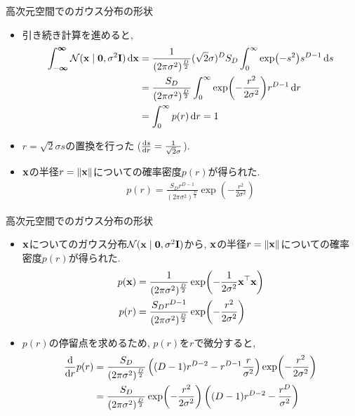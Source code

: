 \documentclass[dvipdfmx,notheorems,t]{beamer}
\begin{document}
\begin{frame}{高次元空間でのガウス分布の形状}
\begin{itemize}
  \item 引き続き計算を進めると,
  \begin{align*}
    \int_{-\boldsymbol{\infty}}^{\boldsymbol{\infty}}
      \mathcal{N}(\vb{x} \mid \vb{0}, \sigma^2 \vb{I}) \dd{\vb{x}}
      &= \frac{1}{(2\pi \sigma^2)^\frac{D}{2}} (\sqrt{2} \sigma)^D
        S_D \int_0^\infty \exp(-s^2) s^{D - 1} \dd{s} \\
      &= \frac{S_D}{(2\pi \sigma^2)^\frac{D}{2}}
        \int_0^\infty \exp(-\frac{r^2}{2 \sigma^2}) r^{D - 1} \dd{r} \\
      &= \int_0^\infty p(r) \dd{r} = 1
  \end{align*}

  \item $r = \sqrt{2} \sigma s$の置換を行った ($\dv{s}{r} = \frac{1}{\sqrt{2} \sigma}$).
  \item $\vb{x}$の半径$r = \left\| \vb{x} \right\|$についての確率密度$p(r)$が得られた.
  \begin{align*}
    p(r) = \frac{S_D r^{D - 1}}{(2\pi \sigma^2)^\frac{D}{2}} \exp(-\frac{r^2}{2 \sigma^2})
  \end{align*}
\end{itemize}
\end{frame}

\begin{frame}{高次元空間でのガウス分布の形状}
\begin{itemize}
  \item $\vb{x}$についてのガウス分布$\mathcal{N}(\vb{x} \mid \vb{0}, \sigma^2 \vb{I})$から,
  $\vb{x}$の半径$r = \left\| \vb{x} \right\|$についての確率密度$p(r)$が得られた.
  \begin{align*}
    p(\vb{x}) &= \frac{1}{(2\pi \sigma^2)^\frac{D}{2}}
      \exp(-\frac{1}{2 \sigma^2} \vb{x}^\top \vb{x}) \\
    p(r) &= \frac{S_D r^{D - 1}}{(2\pi \sigma^2)^\frac{D}{2}} \exp(-\frac{r^2}{2 \sigma^2})
  \end{align*}

  \item $p(r)$の停留点を求めるため, $p(r)$を$r$で微分すると,
  \begin{align*}
    \dv{r} p(r) &= \frac{S_D}{(2\pi \sigma^2)^\frac{D}{2}}
      \left( (D - 1) r^{D - 2} - r^{D - 1} \frac{r}{\sigma^2} \right) \exp(-\frac{r^2}{2 \sigma^2}) \\
      &= \frac{S_D}{(2\pi \sigma^2)^\frac{D}{2}} \exp(-\frac{r^2}{2 \sigma^2})
        \left( (D - 1) r^{D - 2} - \frac{r^D}{\sigma^2} \right)
  \end{align*}
\end{itemize}
\end{frame}
\end{document}
